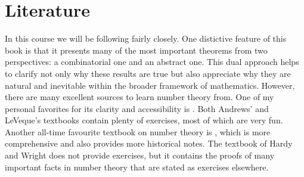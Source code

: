 \documentclass{article}
\theoremstyle{definition}
\theoremstyle{remark}
\begin{document}
\section{Literature}
In this course we will be following \cite{andrews1994} fairly closely. One distictive feature of this book is that it presents many of the most important theorems from two perspectives: a combinatorial one and an abstract one. This dual approach helps to clarify not only why these results are true but also appreciate why they are natural and inevitable within the broader framework of mathematics. However, there are many excellent sources to learn number theory from. One of my personal favorites for its clarity and accessibility is \cite{leveque1956vol1,leveque1956vol2}. Both Andrews' and LeVeque's textbooks contain plenty of exercises, most of which are very fun. Another all-time favourite textbook on number theory is \cite{hardy2008}, which is more comprehensive and also provides more historical notes. The textbook of Hardy and Wright does not provide exercises, but it contains the proofs of many important facts in number theory that are stated as exercises elsewhere.
\end{document}
